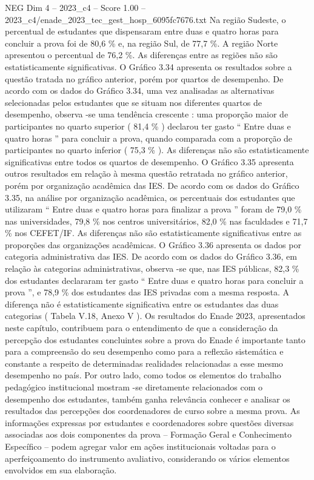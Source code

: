 \begin{textsample}{NEG Dim 4 – 2023\_c4 – Score 1.00 – 2023\_c4/enade\_2023\_tec\_gest\_hosp\_6095fc7676.txt}
Na região Sudeste, o percentual de estudantes que dispensaram entre duas e quatro horas para concluir a prova foi de 80,6 \% e, na região Sul, de 77,7 \%.
A região Norte apresentou o percentual de 76,2 \%.
As diferenças entre as regiões não são estatisticamente significativas.
O Gráfico 3.34 apresenta os resultados sobre a questão tratada no gráfico anterior, porém por quartos de desempenho.
De acordo com os dados do Gráfico 3.34, uma vez analisadas as alternativas selecionadas pelos estudantes que se situam nos diferentes quartos de desempenho, observa -se uma tendência crescente : uma proporção maior de participantes no quarto superior ( 81,4 \% ) declarou ter gasto “ Entre duas e quatro horas ” para concluir a prova, quando comparada com a proporção de participantes no quarto inferior ( 75,3 \% ).
As diferenças não são estatisticamente significativas entre todos os quartos de desempenho.
O Gráfico 3.35 apresenta outros resultados em relação à mesma questão retratada no gráfico anterior, porém por organização acadêmica das IES.
De acordo com os dados do Gráfico 3.35, na análise por organização acadêmica, os percentuais dos estudantes que utilizaram “ Entre duas e quatro horas para finalizar a prova ” foram de 79,0 \% nas universidades, 79,8 \% nos centros universitários, 82,0 \% nas faculdades e 71,7 \% nos CEFET/IF.
As diferenças não são estatisticamente significativas entre as proporções das organizações acadêmicas.
O Gráfico 3.36 apresenta os dados por categoria administrativa das IES.
De acordo com os dados do Gráfico 3.36, em relação às categorias administrativas, observa -se que, nas IES públicas, 82,3 \% dos estudantes declararam ter gasto “ Entre duas e quatro horas para concluir a prova ”, e 78,9 \% dos estudantes das IES privadas com a mesma resposta.
A diferença não é estatisticamente significativa entre os estudantes das duas categorias ( Tabela V.18, Anexo V ).
Os resultados do Enade 2023, apresentados neste capítulo, contribuem para o entendimento de que a consideração da percepção dos estudantes concluintes sobre a prova do Enade é importante tanto para a compreensão do seu desempenho como para a reflexão sistemática e constante a respeito de determinadas realidades relacionadas a esse mesmo desempenho no país.
Por outro lado, como todos os elementos do trabalho pedagógico institucional mostram -se diretamente relacionados com o desempenho dos estudantes, também ganha relevância conhecer e analisar os resultados das percepções dos coordenadores de curso sobre a mesma prova.
As informações expressas por estudantes e coordenadores sobre questões diversas associadas aos dois componentes da prova – Formação Geral e Conhecimento Específico – podem agregar valor em ações institucionais voltadas para o aperfeiçoamento do instrumento avaliativo, considerando os vários elementos envolvidos em sua elaboração.

\end{textsample}
